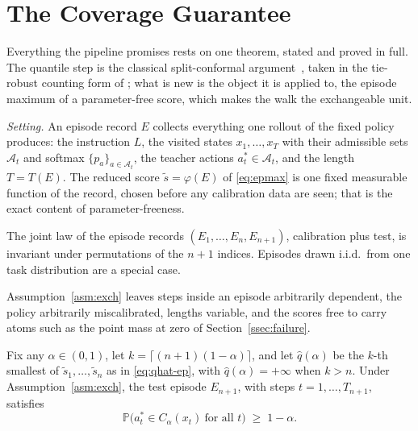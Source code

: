 \section{The Coverage Guarantee}
\label{sec:guarantee}
Everything the pipeline promises rests on one theorem, stated and proved in
full. The quantile step is the classical split-conformal
argument~\cite{vovk2005alrw,lei2018distributionfree,angelopoulos2023gentle},
taken in the tie-robust counting form of
\cite[Lemma~1]{tibshirani2019covariateshift}; what is new is the object it
is applied to, the episode maximum of a parameter-free score, which makes
the walk the exchangeable unit.

\textit{Setting.}
An episode record $E$ collects everything one rollout of the fixed policy
produces: the instruction $L$, the visited states $x_1,\dots,x_T$ with their
admissible sets $\mathcal A_t$ and softmax $\{p_a\}_{a\in\mathcal A_t}$, the
teacher actions $a^*_t\in\mathcal A_t$, and the length $T=T(E)$. The reduced score $\tilde s=\varphi(E)$ of \eqref{eq:epmax} is one fixed
measurable function of the record, chosen before any calibration data are
seen; that is the exact content of parameter-freeness.

\begin{assumption}
\label{asm:exch}
The joint law of the episode records $(E_1,\dots,E_n,E_{n+1})$, calibration
plus test, is invariant under permutations of the $n+1$ indices. Episodes
drawn i.i.d.\ from one task distribution are a special case.
\end{assumption}

Assumption~\ref{asm:exch} leaves steps inside an episode arbitrarily
dependent, the policy arbitrarily miscalibrated, lengths variable, and the
scores free to carry atoms such as the point mass at zero of
Section~\ref{ssec:failure}.

\begin{theorem}
\label{thm:cov}
Fix any $\alpha\in(0,1)$, let $k=\lceil(n+1)(1-\alpha)\rceil$, and let
$\hat q(\alpha)$ be the $k$-th smallest of $\tilde s_1,\dots,\tilde s_n$ as in
\eqref{eq:qhat-ep}, with $\hat q(\alpha)=+\infty$ when $k>n$. Under
Assumption~\ref{asm:exch}, the test episode $E_{n+1}$, with steps
$t=1,\dots,T_{n+1}$, satisfies
\begin{equation}
\mathbb{P}\big(a^*_t\in C_\alpha(x_t)\ \text{for all } t\big)\;\geq\;1-\alpha .
\label{eq:thm-cov}
\end{equation}
\end{theorem}

